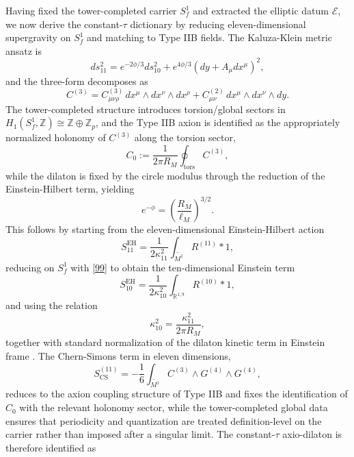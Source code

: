 \documentclass[11pt]{article}
\theoremstyle{remark}
\newcommand{\Z}{\mathbb{Z}}
\newcommand{\R}{\mathbb{R}}
\newcommand{\calE}{\mathcal{E}}
\newcommand{\tM}{\widetilde{M^{1}}}
\begin{document}
Having fixed the tower-completed carrier \(S_f^1\) and extracted the elliptic datum \(\calE\), we now derive the constant-\(\tau\) dictionary by reducing eleven-dimensional supergravity on \(S_f^1\) and matching to Type IIB fields. The Kaluza-Klein metric ansatz is
\begin{equation}\label{99}
ds^{2}_{11}=e^{-2\phi/3}ds^{2}_{10}+e^{4\phi/3}(dy+A_{\mu}dx^{\mu})^{2},
\end{equation}
and the three-form decomposes as
\begin{equation}\label{100}
C^{(3)}=C^{(3)}_{\mu\nu\rho}\,dx^{\mu}\wedge dx^{\nu}\wedge dx^{\rho}+C^{(2)}_{\mu\nu}\,dx^{\mu}\wedge dx^{\nu}\wedge dy.
\end{equation}
The tower-completed structure introduces torsion/global sectors in \(H_1(S_f^1,\Z)\cong \Z\oplus \Z_p\), and the Type IIB axion is identified as the appropriately normalized holonomy of \(C^{(3)}\) along the torsion sector,
\begin{equation}\label{101}
C_{0}:=\frac1{2\pi R_M}\oint_{\mathrm{tors}} C^{(3)},
\end{equation}
while the dilaton is fixed by the circle modulus through the reduction of the Einstein-Hilbert term, yielding
\begin{equation}\label{102}
e^{-\phi}=\left(\frac{R_{M}}{\ell_{M}}\right)^{3/2}.
\end{equation}
This follows by starting from the eleven-dimensional Einstein-Hilbert action
\begin{equation}\label{103}
S_{11}^{\mathrm{EH}}=\frac1{2\kappa_{11}^{2}}\int_{\tM}R^{(11)}*1,
\end{equation}
reducing on \(S_f^1\) with \eqref{99} to obtain the ten-dimensional Einstein term
\begin{equation}\label{104}
S_{10}^{\mathrm{EH}}=\frac1{2\kappa_{10}^{2}}\int_{\R^{1,9}}R^{(10)}*1,
\end{equation}
and using the relation
\begin{equation}\label{105}
\kappa_{10}^{2}=\frac{\kappa_{11}^{2}}{2\pi R_M},
\end{equation}
together with standard normalization of the dilaton kinetic term in Einstein frame \cite{DuffLu1995, HullTownsend1995}. The Chern-Simons term in eleven dimensions,
\begin{equation}\label{106}
S_{\mathrm{CS}}^{(11)}=-\frac16\int_{\tM}C^{(3)}\wedge G^{(4)}\wedge G^{(4)},
\end{equation}
reduces to the axion coupling structure of Type IIB and fixes the identification of \(C_0\) with the relevant holonomy sector, while the tower-completed global data ensures that periodicity and quantization are treated definition-level on the carrier rather than imposed after a singular limit. The constant-\(\tau\) axio-dilaton is therefore identified as
\end{document}
